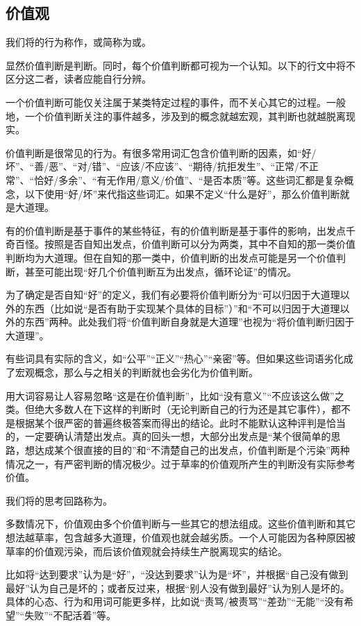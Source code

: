 \subsection{价值观}
我们将的行为称作，或简称为或。
\begin{explain}
显然价值判断是判断。同时，每个价值判断都可视为一个认知。以下的行文中将不区分这二者，读者应能自行分辨。

一个价值判断可能仅关注属于某类特定过程的事件，而不关心其它的过程。一般地，一个价值判断关注的事件越多，涉及到的概念就越宏观，其判断也就越脱离现实。

价值判断是很常见的行为。有很多常用词汇包含价值判断的因素，如“好/坏”、“善/恶”、“对/错”、“应该/不应该”、“期待/抗拒发生”、“正常/不正常”、“恰好/多余”、“有无作用/意义/价值”、“是否本质”等。这些词汇都是复杂概念，以下使用“好/坏”来代指这些词汇。如果不定义“什么是好”，那么价值判断就是大道理。

有的价值判断是基于事件的某些特征，有的价值判断是基于事件的影响，出发点千奇百怪。按照是否自知出发点，价值判断可以分为两类，其中不自知的那一类价值判断均为大道理。但在自知的那一类中，价值判断的出发点可能是另一个价值判断，甚至可能出现“好几个价值判断互为出发点，循环论证”的情况。

为了确定是否自知“好”的定义，我们有必要将价值判断分为“可以归因于大道理以外的东西（比如说“是否有助于实现某个具体的目标”）”和“不可以归因于大道理以外的东西”两种。此处我们将“价值判断自身就是大道理”也视为“将价值判断归因于大道理”。
\end{explain}
有些词具有实际的含义，如“公平”“正义”“热心”“亲密”等。但如果这些词语劣化成了宏观概念，那么与之相关的判断就也会劣化为价值判断。
\begin{explain}
用大词容易让人容易忽略“这是在价值判断”，比如“没有意义”“不应该这么做”之类。但绝大多数人在下这样的判断时（无论判断自己的行为还是其它事件），都不是根据某个很严密的普遍终极答案而得出的结论。此时不能默认这种评判是恰当的，一定要确认清楚出发点。真的回头一想，大部分出发点是“某个很简单的思路，想达成某个很直接的目的”和“不清楚自己的出发点，价值判断是个污染”两种情况之一，有严密判断的情况极少。过于草率的价值观所产生的判断没有实际参考价值。
\end{explain}
我们将的思考回路称为。
\begin{explain}
多数情况下，价值观由多个价值判断与一些其它的想法组成。这些价值判断和其它想法越草率，包含越多大道理，价值观也就会越劣质。一个人可能因为各种原因被草率的价值观污染，而后该价值观就会持续生产脱离现实的结论。

比如将“达到要求”认为是“好”，“没达到要求”认为是“坏”，并根据“自己没有做到最好”认为自己是坏的；或者反过来，根据“别人没有做到最好”认为别人是坏的。具体的心态、行为和用词可能更多样，比如说“责骂/被责骂”“差劲”“无能”“没有希望”“失败”“不配活着”等。
\end{explain}
